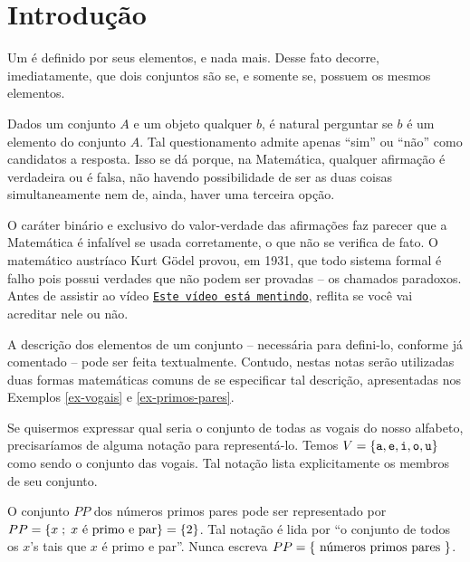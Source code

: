 \section{Introdução}
\label{sec:intro}

Um  é definido por seus elementos, e nada mais.
Desse fato decorre, imediatamente, que dois conjuntos são  se, e somente se, possuem os mesmos elementos.

Dados um conjunto $A$ e um objeto qualquer $b$, é natural perguntar se $b$ é um elemento do conjunto $A$.
Tal questionamento admite apenas ``sim'' ou ``não'' como candidatos a resposta.
Isso se dá porque, na Matemática, qualquer afirmação é verdadeira ou é falsa, não havendo possibilidade de ser as duas coisas simultaneamente nem de, ainda, haver uma terceira opção. 

O caráter binário e exclusivo do valor-verdade das afirmações faz parecer que a Matemática é infalível se usada corretamente, o que não se verifica de fato.
O matemático austríaco Kurt Gödel provou, em 1931, que todo sistema formal é falho pois possui verdades que não podem ser provadas -- os chamados paradoxos.
Antes de assistir ao vídeo \href{https://youtu.be/UI1xR_AECrU}{{\tt Este vídeo está mentindo}}, reflita se você vai acreditar nele ou não.

\begin{remark}
A descrição dos elementos de um conjunto -- necessária para defini-lo, conforme já comentado -- pode ser feita textualmente.
Contudo, nestas notas serão utilizadas duas formas matemáticas comuns de se especificar tal descrição, apresentadas nos Exemplos \ref{ex-vogais} e \ref{ex-primos-pares}. 
\end{remark}

\begin{example}
\label{ex-vogais}
Se quisermos expressar qual seria o conjunto de todas as vogais do nosso alfabeto, precisaríamos de alguma notação para representá-lo. 
Temos $V=\left\{ \texttt{a}, \texttt{e}, \texttt{i}, \texttt{o}, \texttt{u}\right\}$ como sendo o conjunto das vogais. Tal notação lista explicitamente os membros de seu conjunto.
\end{example}

\begin{example}
\label{ex-primos-pares}
O conjunto $PP$ dos números primos pares pode ser representado por $PP = \left\{ x \;;\; x \text{ é primo e par}\right\} = \left\{ 2\right\}$.
Tal notação é lida por ``o conjunto de todos os $x$'s tais que $x$ é primo e par''.
Nunca escreva $PP = \left\{ \text{ números primos pares }\right\}$.
\end{example}

%

